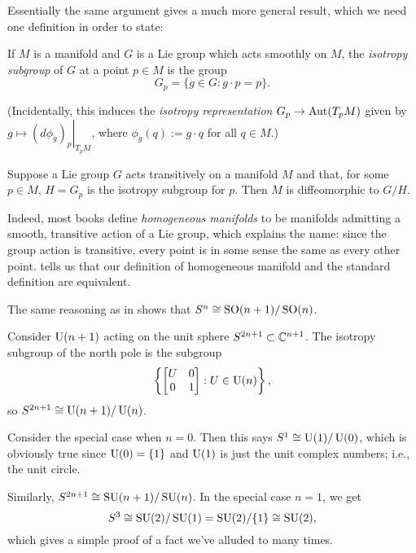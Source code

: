 Essentially the same argument gives a much more general result, which we need one definition in order to state:

\begin{definition}\label{def:isotropy subgroup}
	If $M$ is a manifold and $G$ is a Lie group which acts smoothly on $M$, the \emph{isotropy subgroup} of $G$ at a point $p \in M$ is the group
	\[
		G_p = \{g\in G : g \cdot p = p\}.
	\]
\end{definition}

(Incidentally, this induces the \emph{isotropy representation} $G_p \to \operatorname{Aut}(T_pM)$ given by $g \mapsto \left.(d \phi_g)_p \right|_{T_pM}$, where $\phi_g(q) := g \cdot q$ for all $q \in M$.)

\begin{theorem}\label{thm:homogeneous and isotropy}
	Suppose a Lie group $G$ acts transitively on a manifold $M$ and that, for some $p \in M$, $H = G_p$ is the isotropy subgroup for $p$. Then $M$ is diffeomorphic to $G/H$.
\end{theorem}

Indeed, most books define \emph{homogeneous manifolds} to be manifolds admitting a smooth, transitive action of a Lie group, which explains the name: since the group action is transitive, every point is in some sense the same as every other point.  tells us that our definition of homogeneous manifold and the standard definition are equivalent.

\begin{example}
	The same reasoning as in  shows that $S^n \cong \operatorname{SO}(n+1)/\operatorname{SO}(n)$.
\end{example}

\begin{example}
	Consider $\operatorname{U}(n+1)$ acting on the unit sphere $S^{2n+1} \subset \mathbb{C}^{n+1}$. The isotropy subgroup of the north pole is the subgroup
	\[
		\left\{ \begin{bmatrix} U & 0 \\ 0 & 1 \end{bmatrix} : U \in \operatorname{U}(n)\right\},
	\]
	so $S^{2n+1} \cong \operatorname{U}(n+1)/\operatorname{U}(n)$.
	
	Consider the special case when $n=0$. Then this says $S^1 \cong \operatorname{U}(1)/\operatorname{U}(0)$, which is obviously true since $\operatorname{U}(0) = \{1\}$ and $\operatorname{U}(1)$ is just the unit complex numbers; i.e., the unit circle.
\end{example}

\begin{example}
	Similarly, $S^{2n+1} \cong \operatorname{SU}(n+1)/\operatorname{SU}(n)$. In the special case $n=1$, we get 
	\[
		S^3 \cong \operatorname{SU}(2)/\operatorname{SU}(1) = \operatorname{SU}(2)/\{1\} \cong \operatorname{SU}(2),
	\]
	which gives a simple proof of a fact we've alluded to many times.
\end{example}